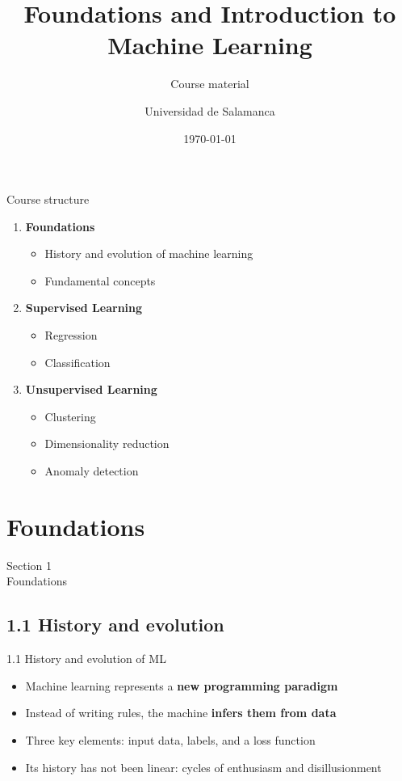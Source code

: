 \documentclass[aspectratio=169]{beamer}
\title[Foundations and Introduction to ML]{Foundations and Introduction to\\Machine Learning}
\subtitle{Course material}
\author{Universidad de Salamanca}
\institute{Faculties of Sciences and Chemical Sciences}
\date{\today}
\begin{document}
\begin{frame}
  \titlepage
\end{frame}

\begin{frame}{Course structure}
  \begin{enumerate}
    \item \textbf{Foundations}
    \begin{itemize}
      \item History and evolution of machine learning
      \item Fundamental concepts
    \end{itemize}
    \item \textbf{Supervised Learning}
    \begin{itemize}
      \item Regression
      \item Classification
    \end{itemize}
    \item \textbf{Unsupervised Learning}
    \begin{itemize}
      \item Clustering
      \item Dimensionality reduction
      \item Anomaly detection
    \end{itemize}
  \end{enumerate}
\end{frame}

\section{Foundations}
\begin{frame}
  \centering
  {\Huge Section 1}\\[0.5em]
  {\Large Foundations}
\end{frame}

\subsection{1.1 History and evolution}

\begin{frame}{1.1 History and evolution of ML}
  \begin{itemize}
    \item Machine learning represents a \textbf{new programming paradigm}
    \item Instead of writing rules, the machine \textbf{infers them from data}
    \item Three key elements: input data, labels, and a loss function
    \item Its history has not been linear: cycles of enthusiasm and disillusionment
  \end{itemize}
\end{frame}
\end{document}
